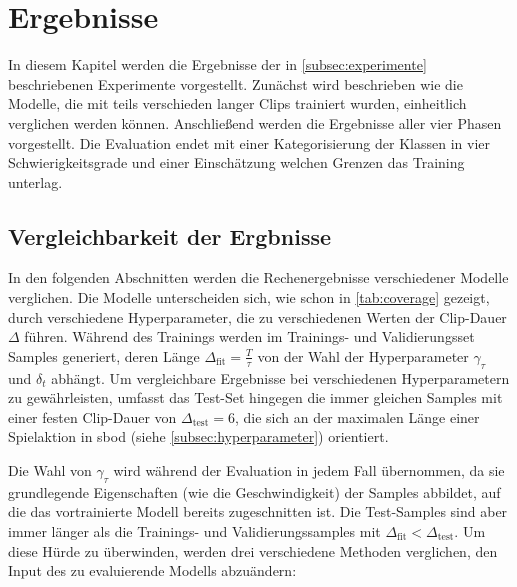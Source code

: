 \chapter{Ergebnisse}
\label{ch:results}

In diesem Kapitel werden die Ergebnisse der in \autoref{subsec:experimente} beschriebenen Experimente vorgestellt.
Zunächst wird beschrieben wie die Modelle, die mit teils verschieden langer Clips trainiert wurden, einheitlich verglichen werden können.
Anschließend werden die Ergebnisse aller vier Phasen vorgestellt.
Die Evaluation endet mit einer Kategorisierung der Klassen in vier Schwierigkeitsgrade und einer Einschätzung welchen Grenzen das Training unterlag.

\section{Vergleichbarkeit der Ergbnisse}

In den folgenden Abschnitten werden die Rechenergebnisse verschiedener Modelle verglichen.
Die Modelle unterscheiden sich, wie schon in \autoref{tab:coverage} gezeigt, durch verschiedene Hyperparameter, die zu verschiedenen Werten der Clip-Dauer $\Delta$ führen.
Während des Trainings werden im Trainings- und Validierungsset Samples generiert, deren Länge $\Delta_\text{fit} = \frac{T}{\tau}$ von der Wahl der Hyperparameter $\gamma_\tau$ und $\delta_t$ abhängt.
Um vergleichbare Ergebnisse bei verschiedenen Hyperparametern zu gewährleisten, umfasst das Test-Set hingegen die immer gleichen Samples mit einer festen Clip-Dauer von $\Delta_\text{test}=6$, die sich an der maximalen Länge einer Spielaktion in \gls{sbod} (siehe \autoref{subsec:hyperparameter}) orientiert.

Die Wahl von $\gamma_\tau$ wird während der Evaluation in jedem Fall übernommen, da sie grundlegende Eigenschaften (wie die Geschwindigkeit) der Samples abbildet, auf die das vortrainierte Modell bereits zugeschnitten ist.
Die Test-Samples sind aber immer länger als die Trainings- und Validierungssamples mit $\Delta_\text{fit} < \Delta_\text{test}$.
Um diese Hürde zu überwinden, werden drei verschiedene Methoden verglichen, den Input des zu evaluierende Modells abzuändern:

